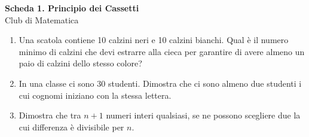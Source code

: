 \documentclass[12pt,a4paper]{article}
\begin{document}
\begin{center}
    {\large\bf Scheda 1. Principio dei Cassetti} \\
    \vspace{2mm}
    {\small Club di Matematica}
\end{center}

\vspace{5mm}

\begin{enumerate}
    \item Una scatola contiene 10 calzini neri e 10 calzini bianchi. Qual è il numero minimo di calzini che devi estrarre alla cieca per garantire di avere almeno un paio di calzini dello stesso colore?
    
    \item In una classe ci sono 30 studenti. Dimostra che ci sono almeno due studenti i cui cognomi iniziano con la stessa lettera.
    
    \item Dimostra che tra $n+1$ numeri interi qualsiasi, se ne possono scegliere due la cui differenza è divisibile per $n$.
\end{enumerate}
\end{document}
